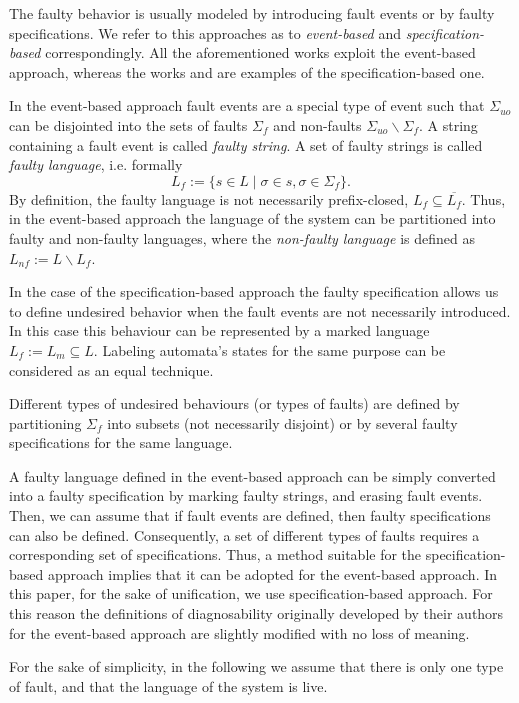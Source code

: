 The faulty behavior is usually modeled by introducing fault events or by faulty
specifications. We refer to this approaches as to \emph{event-based} and
\emph{specification-based} correspondingly. All the aforementioned works exploit
the event-based approach, whereas the works \cite{zhou_decentralized_2008} and
\cite{sartini_methodology_2010} are examples of the specification-based one.

In the event-based approach fault events are a special type of event such that
$\Sigma_{uo}$ can be disjointed into the sets of faults $\Sigma_f$ and
non-faults $\Sigma_{uo}\backslash \Sigma_f$. A string containing a fault event
is called \emph{faulty string}. A set of faulty strings is called \emph{faulty
language}, i.e. formally 
$$L_f := \{ s \in L \mid \sigma \in s, \sigma \in \Sigma_f\}.$$ 
By definition, the faulty language is not necessarily prefix-closed,
$L_f \subseteq \overline{L_f}$. Thus, in the event-based approach the language
of the system can be partitioned into faulty and non-faulty languages, where the
\emph{non-faulty language} is defined as $L_{nf} := L \backslash L_f$.

In the case of the specification-based approach the faulty specification allows
us to define undesired behavior when the fault events are not necessarily
introduced. In this case this behaviour can be represented by a marked
language $L_f := L_m \subseteq L$. Labeling automata's states for the same
purpose can be considered as an equal technique.

Different types of undesired behaviours (or types of faults) are defined by
partitioning $\Sigma_f$ into subsets (not necessarily disjoint) or by several
faulty specifications for the same language. 

A faulty language defined in the event-based approach can be simply converted
into a faulty specification by marking faulty strings, and erasing fault events.
Then, we can assume that if fault events are defined, then faulty specifications
can also be defined. Consequently, a set of different types of faults requires a
corresponding set of specifications.
Thus, a method suitable for the specification-based approach implies that it can
be adopted for the event-based approach. In this paper, for the sake of
unification, we use specification-based approach. For this reason the
definitions of diagnosability originally developed by their authors for the
event-based approach are slightly modified with no loss of meaning.

For the sake of simplicity, in the following we assume that there is only one
type of fault, and that the language of the system is live.

